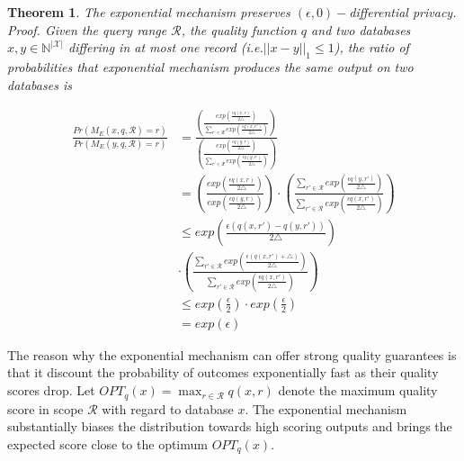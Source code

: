 \documentclass[a4paper, 11pt]{article} %
\makeatletter
\DeclareRobustCommand{\ie}{i.e.\@\xspace}
\newtheorem{theorem}{Theorem}
\makeatother
\begin{document}
\begin{theorem}
The exponential mechanism preserves $(\epsilon, 0)-$differential privacy.
\textit{Proof. Given the query range $\mathcal{R}$, the quality function $q$ and two databases $x, y \in \mathbb{N}^{|\mathcal{X}|}$ differing in at most one record (\ie $||x-y||_1 \leq 1$), the ratio of probabilities that exponential mechanism produces the same output on two databases is }

\begin{align}
\frac{Pr(M_E(x, q, \mathcal{R})=r)}{Pr(M_E(y, q, \mathcal{R})=r)} &= 
 \frac{
\left(
\frac{exp( \frac{\epsilon q(x,r) }{2 \triangle})}{\sum_{r' \in \mathcal{R}} exp( \frac{\epsilon q(x,r') }{2 \triangle})}
\right)
}
{
\left(
\frac{exp( \frac{\epsilon q(y,r) }{2 \triangle})}{\sum_{r' \in \mathcal{R}} exp( \frac{\epsilon q(y,r') }{2 \triangle})}
\right)
} \\
&= 
\left(
\frac{exp( \frac{\epsilon q(x,r) }{2 \triangle})}
{exp( \frac{\epsilon q(y,r) }{2 \triangle})}
\right)
\cdot
\left(
\frac{\sum_{r' \in \mathcal{R}} exp( \frac{\epsilon q(y,r') }{2 \triangle})}{\sum_{r' \in \mathcal{R}} exp( \frac{\epsilon q(x,r') }{2 \triangle})}
\right) \\
& \leq exp \left(
\frac{\epsilon (q(x, r') - q(y, r') )}{2 \triangle} 
\right) \\
& \cdot
\left(
\frac{\sum_{r' \in \mathcal{R}} exp( \frac{\epsilon (q(x,r')+\triangle) }{2 \triangle})}
{\sum_{r' \in \mathcal{R}} exp( \frac{\epsilon q(x,r') }{2 \triangle})}
\right) \\
& \leq exp(\frac{\epsilon}{2}) \cdot exp(\frac{\epsilon}{2}) 
 \\
&= exp(\epsilon)
\end{align}
\end{theorem}


The reason why the exponential mechanism can offer strong quality guarantees is that it discount the probability of outcomes exponentially fast as their quality scores drop. Let $OPT_q(x) = \max_{r \in \mathcal{R}} q(x, r)$ denote the maximum quality score in scope $\mathcal{R}$ with regard to database $x$. The exponential mechanism substantially biases the distribution towards high scoring outputs and brings the expected score close to the optimum $OPT_q(x)$.
\end{document}
